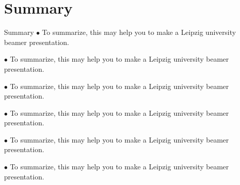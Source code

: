 \section{Summary}
\begin{frame}{Summary}
    $\bullet$ To summarize, this may help you to make a Leipzig university beamer presentation.
    
    $\bullet$ To summarize, this may help you to make a Leipzig university beamer presentation.
    
    $\bullet$ To summarize, this may help you to make a Leipzig university beamer presentation.
    
    $\bullet$ To summarize, this may help you to make a Leipzig university beamer presentation.
    
    $\bullet$ To summarize, this may help you to make a Leipzig university beamer presentation.
    
    $\bullet$ To summarize, this may help you to make a Leipzig university beamer presentation.
    
    
    
\end{frame}